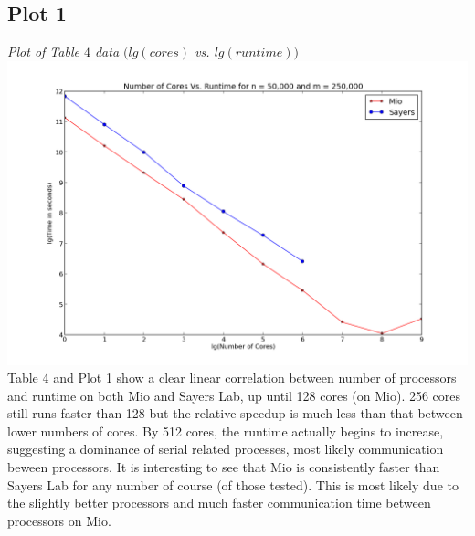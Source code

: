 \documentclass[letterpaper, 12pt]{article}
\begin{document}
	\subsection*{Plot 1} \small\textit{Plot of Table $4$ data $(lg(cores)$ vs. $lg(runtime))$} \\
	\normalsize
	\includegraphics[width=.75\linewidth]{ProjectFiles/results/plots/coresVtime.png} \\
	Table 4 and Plot 1 show a clear linear correlation between number of processors and runtime on both Mio and Sayers Lab, up until 128 cores (on Mio). 256 cores still runs faster than 128 but the relative speedup is much less than that between lower numbers of cores. By 512 cores, the runtime actually begins to increase, suggesting a dominance of serial related processes, most likely communication beween processors. It is interesting to see that Mio is consistently faster than Sayers Lab for any number of course (of those tested). This is most likely due to the slightly better processors and much faster communication time between processors on Mio.
	
\end{document}
